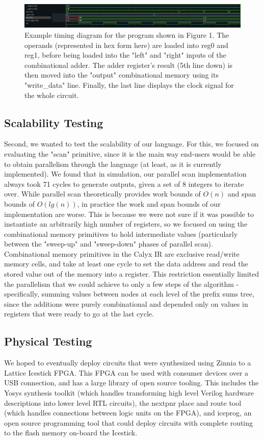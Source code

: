 \documentclass[12pt]{article}
\begin{document}
\begin{figure}
    \includegraphics[width=\linewidth]{images/timing_sim.png}
    \caption{Example timing diagram for the program shown in Figure 1. The operands (represented in hex form here) are loaded into reg0 and reg1, before being loaded into the "left" and "right" inputs of the combinational adder. The adder register's result (5th line down) is then moved into the "output" combinational memory using its "write\_data" line. Finally, the last line displays the clock signal for the whole circuit. }
\end{figure}
\subsection{Scalability Testing}
Second, we wanted to test the scalability of our language. For this, we focused on evaluating the "scan" primitive, since
it is the main way end-users would be able to obtain parallelism through the language (at least, as it is currently implemented).
We found that in simulation, our parallel scan implementation always took 71 cycles to generate outputs, given a set of 8 integers
to iterate over. While parallel scan theoretically provides work bounds of $O(n)$ and span bounds of $O(lg(n))$, in practice the
work and span bounds of our implementation are worse. This is because we were not sure if it was possible to instantiate
an arbitrarily high number of registers, so we focused on using the combinational memory primitives to hold intermediate values
(particularly between the "sweep-up" and "sweep-down" phases of parallel scan). Combinational memory primitives in the Calyx IR
are exclusive read/write memory cells, and take at least one cycle to set the data address and read the stored value out of the memory
into a register. This restriction essentially limited the parallelism that we could achieve to only a few steps of the algorithm - specifically,
summing values between nodes at each level of the prefix sums tree, since the additions were purely combinational and depended only
on values in registers that were ready to go at the last cycle.
\subsection{Physical Testing}
We hoped to eventually deploy circuits that were synthesized using Zinnia to a Lattice Icestick FPGA.
This FPGA can be used with consumer devices over a USB connection, and has a large library of open source tooling.
This includes the Yosys synthesis toolkit (which handles transforming high level Verilog hardware descriptions into
lower level RTL circuits), the nextpnr place and route tool (which handles connections between logic units
on the FPGA), and iceprog, an open source programming tool that could deploy circuits with complete routing
to the flash memory on-board the Icestick.
\end{document}
